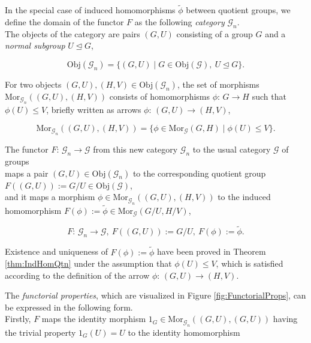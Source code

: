 \documentclass{amsart}
\theoremstyle{definition}
\numberwithin{equation}{section}
\begin{document}
In the special case of induced homomorphisms \(\tilde{\phi}\) between quotient groups,
we define the domain of the functor \(F\) as the following \textit{category} \(\mathcal{G}_n\).\\
The objects of the category are pairs \((G,U)\)
consisting of a group \(G\) and a \textit{normal subgroup} \(U\unlhd G\),

\begin{equation}
\label{eqn:ObjGNormal}
\mathrm{Obj}(\mathcal{G}_n)=\lbrace (G,U)\mid G\in\mathrm{Obj}(\mathcal{G}),\ U\unlhd G\rbrace.
\end{equation}

\noindent
For two objects \((G,U),(H,V)\in\mathrm{Obj}(\mathcal{G}_n)\),
the set of morphisms \(\mathrm{Mor}_{\mathcal{G}_n}((G,U),(H,V))\)
consists of homomorphisms \(\phi:\,G\to H\) such that \(\phi(U)\le V\),
briefly written as arrows \(\phi:\,(G,U)\to (H,V)\),

\begin{equation}
\label{eqn:MorGNormal}
\mathrm{Mor}_{\mathcal{G}_n}((G,U),(H,V))=\lbrace\phi\in\mathrm{Mor}_{\mathcal{G}}(G,H)\mid\phi(U)\le V\rbrace.
\end{equation}

\noindent
The functor \(F:\,\mathcal{G}_n\to\mathcal{G}\)
from this new category \(\mathcal{G}_n\) to the usual category \(\mathcal{G}\) of groups\\
maps a pair \((G,U)\in\mathrm{Obj}(\mathcal{G}_n)\) to the corresponding quotient group \(F((G,U)):=G/U\in\mathrm{Obj}(\mathcal{G})\),\\
and it maps a morphism \(\phi\in\mathrm{Mor}_{\mathcal{G}_n}((G,U),(H,V))\)
to the induced homomorphism \(F(\phi):=\tilde{\phi}\in\mathrm{Mor}_{\mathcal{G}}(G/U,H/V)\),

\begin{equation}
\label{eqn:FunctorGNormal}
F:\,\mathcal{G}_n\to\mathcal{G},\ F((G,U)):=G/U,\ F(\phi):=\tilde{\phi}.
\end{equation}

\noindent
Existence and uniqueness of \(F(\phi):=\tilde{\phi}\) have been proved in Theorem
\ref{thm:IndHomQtn}
under the assumption that \(\phi(U)\le V\),
which is satisfied according to the definition of the arrow \(\phi:\,(G,U)\to (H,V)\).


The \textit{functorial properties}, which are visualized in Figure
\ref{fig:FunctorialProps},
can be expressed in the following form.\\
Firstly, \(F\) maps the identity morphism \(1_G\in\mathrm{Mor}_{\mathcal{G}_n}((G,U),(G,U))\)
having the trivial property \(1_G(U)=U\)
to the identity homomorphism
\end{document}
